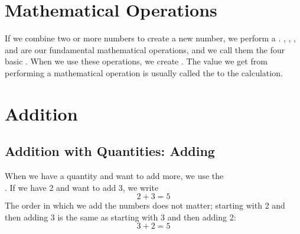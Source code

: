 




	\newpage
	\section{Mathematical Operations}
	If we combine two or more numbers to create a new number, we perform a . , , , and  are our fundamental mathematical operations, and we call them the four basic . When we use these operations, we create . The value we get from performing a mathematical operation is usually called the  to the calculation.
	
	\section{Addition \label{Addisjon} }
	\subsection*{Addition with Quantities: Adding}
	When we have a quantity and want to add more, we use the  \\
	\sym{$ + $}
	\!\!. If we have 2 and want to add 3, we write
	\[ 2+3=5 \]
	The order in which we add the numbers does not matter; starting with 2 and then adding 3 is the same as starting with 3 and then adding 2:
	\[ 3+2=5 \]
	 \regv
	\newpage
	
